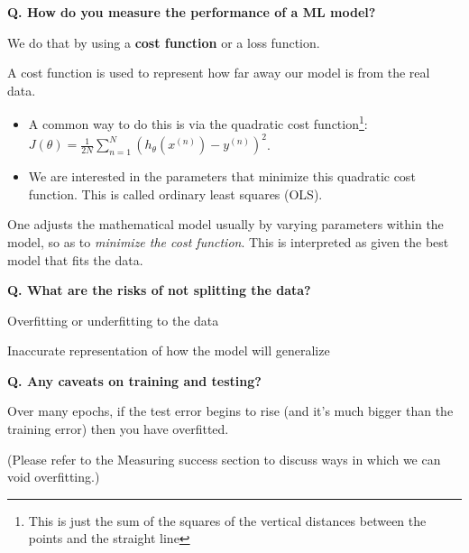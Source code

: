 \begin{frame}[fragile]{\textbf{Q. How do you measure the performance of a ML model?}}
  \begin{wideitemize}
    \item We do that by using a \textbf{cost function} or a loss function.
    \item A cost function is used to represent how far away our model is from the real data.
    \begin{itemize}
      \item A common way to do this is via the quadratic cost function\footnote{This is
      just the sum of the squares of the vertical distances between the points and the straight line}:\vspace{.4em}
      $J(\theta) = \frac{1}{2N}\sum^{N}_{n=1}(h_{\theta}(x^{(n)}) - y^{(n)})^{2}$.\vspace{.4em}
      \item We are interested in the parameters that minimize this quadratic cost function.
      This is called ordinary least squares (OLS).
    \end{itemize}
    \item One adjusts the mathematical model usually by varying parameters within the model, so as
    to \textit{minimize the cost function}. This is interpreted as given the best model that fits the data.
  \end{wideitemize}
\end{frame}

\begin{frame}[fragile]{\textbf{Q. What are the risks of not splitting the data?}}
  \begin{wideitemize}
    \item Overfitting or underfitting to the data
    \item Inaccurate representation of how the model will generalize
  \end{wideitemize}
\end{frame}

\begin{frame}[fragile]{\textbf{Q. Any caveats on training and testing?}}
  \begin{wideitemize}
    \item Over many epochs, if the test error begins to rise (and it's much
    bigger than the training error) then you have overfitted.
    \item (Please refer to the Measuring success section to discuss ways in
    which we can void overfitting.)
  \end{wideitemize}
\end{frame}

